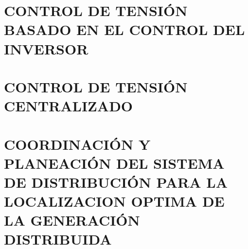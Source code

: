 \documentclass[12pt, letterpaper]{report}
\begin{document}
\chapter{CONTROL DE TENSIÓN BASADO EN EL CONTROL DEL INVERSOR }
\label{cap_inversor}
\chapter{CONTROL DE TENSIÓN CENTRALIZADO}
\label{cap_central}
\chapter{COORDINACIÓN Y PLANEACIÓN  DEL SISTEMA DE DISTRIBUCIÓN PARA LA LOCALIZACION OPTIMA DE LA GENERACIÓN DISTRIBUIDA }


\label{cap_planeacion}
\cite{Idlbi2013}



%
\end{document}
